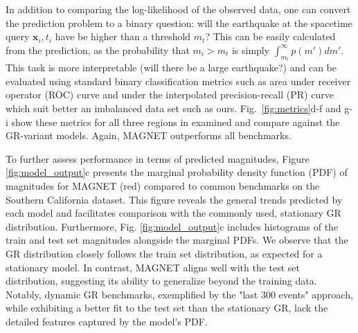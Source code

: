 \documentclass[pdflatex]{sn-jnl}
\begin{document}
In addition to comparing the log-likelihood of the observed data, one can convert the prediction problem to a binary question: will the earthquake at the spacetime query $\textbf{x}_i, t_i$ have be higher than a threshold $m_t$? This can be easily calculated from the prediction, as the probability that $m_i>m_t$ is simply $\int_{m_t}^{\infty}p(m')dm'$.
This task is more interpretable (will there be a large earthquake?) and can be evaluated using standard binary classification metrics such as area under receiver operator (ROC) curve \cite{Murphy} and under the interpolated precision-recall (PR) curve \cite{buttcher_information_2010} which suit better an imbalanced data set such as ours. Fig.~\ref{fig:metrics}d-f and g-i show these metrics for all three regions in examined and compare against the GR-variant models. Again, MAGNET outperforms all benchmarks.

To further assess performance in terms of predicted magnitudes, Figure \ref{fig:model_output}c presents the marginal probability density function (PDF) of magnitudes for MAGNET (red) compared to common benchmarks on the Southern California dataset. This figure reveals the general trends predicted by each model and facilitates comparison with the commonly used, stationary GR distribution. Furthermore, Fig. \ref{fig:model_output}c includes histograms of the train and test set magnitudes alongside the marginal PDFs.  We observe that the GR distribution closely follows the train set distribution, as expected for a stationary model.  In contrast, MAGNET aligns well with the test set distribution, suggesting its ability to generalize beyond the training data. Notably, dynamic GR benchmarks, exemplified by the "last 300 events" approach,  while exhibiting a better fit to the test set than the stationary GR, lack the detailed features captured by the model's PDF.
\end{document}
